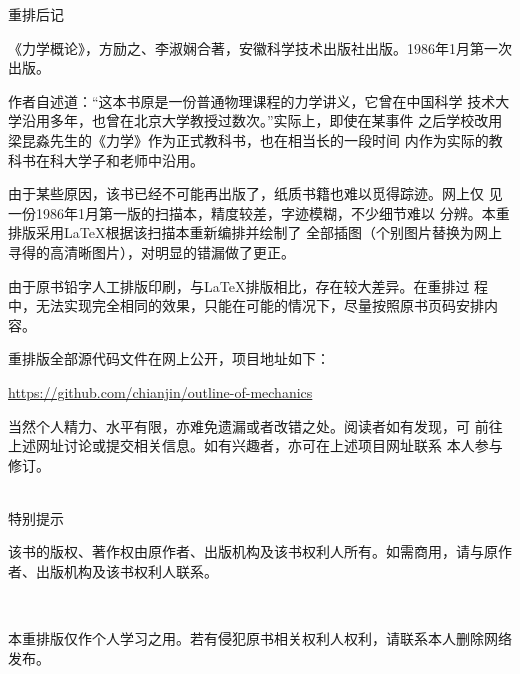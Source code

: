 \clearpage
\pagestyle{empty}
\setcounter{page}{1}
\label{afterword}
\begin{center}
  \xbsong 重\hspace{0.333em}排\hspace{0.333em}后\hspace{0.333em}记
\end{center}
\vspace{1em}



《力学概论》，方励之、李淑娴合著，安徽科学技术出版社出版。1986年1月第一次出版。

作者自述道：“这本书原是一份普通物理课程的力学讲义，它曾在中国科学
技术大学沿用多年，也曾在北京大学教授过数次。”实际上，即使在某事件
之后学校改用梁昆淼先生的《力学》作为正式教科书，也在相当长的一段时间
内作为实际的教科书在科大学子和老师中沿用。

由于某些原因，该书已经不可能再出版了，纸质书籍也难以觅得踪迹。网上仅
见一份1986年1月第一版的扫描本，精度较差，字迹模糊，不少细节难以
分辨。本重排版采用\LaTeX 根据该扫描本重新编排并绘制了
全部插图（个别图片替换为网上寻得的高清晰图片），对明显的错漏做了更正。

由于原书铅字人工排版印刷，与\LaTeX 排版相比，存在较大差异。在重排过
程中，无法实现完全相同的效果，只能在可能的情况下，尽量按照原书页码安排内容。

重排版全部源代码文件在网上公开，项目地址如下：
\begin{center}
    \href{https://github.com/chianjin/outline-of-mechanics}{https://github.com/chianjin/outline-of-mechanics}
\end{center}

当然个人精力、水平有限，亦难免遗漏或者改错之处。阅读者如有发现，可
前往上述网址讨论或提交相关信息。如有兴趣者，亦可在上述项目网址联系
本人参与修订。

\clearpage
\label{tips}
\heiti {}
\begin{center}
    ~\\
    特\hspace{0.333em}别\hspace{0.333em}提\hspace{0.333em}示
\end{center}
\normalsize
\vspace{1em}

该书的版权、著作权由原作者、出版机构及该书权利人所有。如需商用，请与原作者、出版机构及该书权利人联系。

~

本重排版仅作个人学习之用。若有侵犯原书相关权利人权利，请联系本人删除网络发布。
